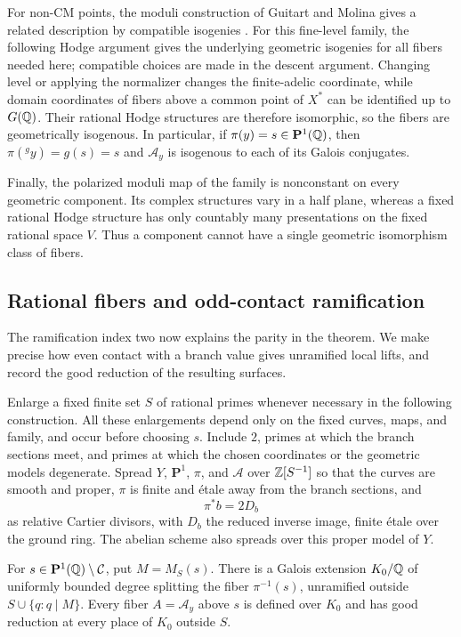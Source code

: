 For non-CM points, the moduli construction of Guitart and Molina gives
a related description by compatible isogenies
\cite[Lemma~1, Corollary~2, and Section~3]{GuitartMolina2009}.
For this fine-level family, the following Hodge argument gives the
underlying geometric isogenies for all fibers needed here; compatible
choices are made in the descent argument.  Changing level or applying the normalizer changes
the finite-adelic coordinate, while domain coordinates of fibers
above a common point of $X^*$ can be identified up to $G(\mathbb Q)$.
Their rational Hodge structures are therefore isomorphic, so the
fibers are geometrically isogenous.  In particular, if
$\pi(y)=s\in\mathbf P^1(\mathbb Q)$, then $\pi({}^g y)=g(s)=s$ and
$\mathcal A_y$ is isogenous to each of its Galois conjugates.

Finally, the polarized moduli map of the family is nonconstant on
every geometric component.  Its complex structures vary in a half
plane, whereas a fixed rational Hodge structure has only countably
many presentations on the fixed rational space $V$.  Thus a component
cannot have a single geometric isomorphism class of fibers.

\subsection{Rational fibers and odd-contact ramification}

The ramification index two now explains the parity in the theorem.
We make precise how even contact with a branch value gives unramified
local lifts, and record the good reduction of the resulting surfaces.

Enlarge a fixed finite set $S$ of rational primes whenever necessary
in the following construction.  All these enlargements depend only
on the fixed curves, maps, and family, and occur before choosing $s$.
Include $2$, primes at which the branch sections meet, and primes at
which the chosen coordinates or the geometric models degenerate.
Spread $Y$, $\mathbf P^1$, $\pi$, and $\mathcal A$ over
$\mathbb Z[S^{-1}]$ so that the curves are smooth and proper, $\pi$ is finite
and étale away from the branch sections, and
\[
                         \pi^*b=2D_b
\]
as relative Cartier divisors, with $D_b$ the reduced inverse image,
finite étale over the ground ring.  The abelian scheme also spreads
over this proper model of $Y$.

\begin{lemma}\label{hei:fiber-field}
For $s\in\mathbf P^1(\mathbb Q)\setminus\mathcal C$, put $M=M_S(s)$.
There is a Galois extension $K_0/\mathbb Q$ of uniformly bounded degree
splitting the fiber $\pi^{-1}(s)$, unramified outside
$S\cup\{q:q\mid M\}$.  Every fiber $A=\mathcal A_y$ above $s$ is
defined over $K_0$ and has good reduction at every place of $K_0$
outside $S$.
\end{lemma}

